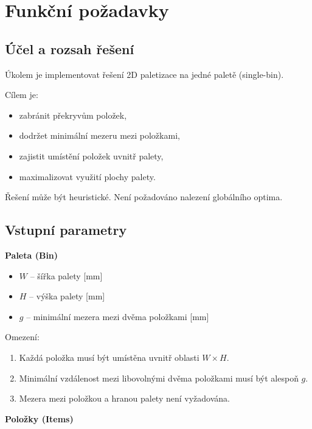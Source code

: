 \documentclass[12pt,a4paper]{article}
\begin{document}
\section{Funkční požadavky}

\subsection{Účel a rozsah řešení}

Úkolem je implementovat řešení 2D paletizace na jedné paletě (single-bin).

Cílem je:

\begin{itemize}
    \item zabránit překryvům položek,
    \item dodržet minimální mezeru mezi položkami,
    \item zajistit umístění položek uvnitř palety,
    \item maximalizovat využití plochy palety.
\end{itemize}

Řešení může být heuristické. Není požadováno nalezení globálního optima.

\subsection{Vstupní parametry}

\textbf{Paleta (Bin)}

\begin{itemize}
    \item $W$ -- šířka palety [mm]
    \item $H$ -- výška palety [mm]
    \item $g$ -- minimální mezera mezi dvěma položkami [mm]
\end{itemize}

Omezení:

\begin{enumerate}
    \item Každá položka musí být umístěna uvnitř oblasti $W \times H$.
    \item Minimální vzdálenost mezi libovolnými dvěma položkami musí být alespoň $g$.
    \item Mezera mezi položkou a hranou palety není vyžadována.
\end{enumerate}

\textbf{Položky (Items)}
\end{document}
